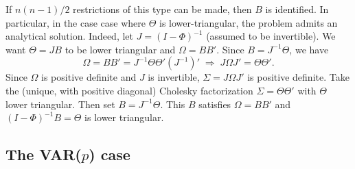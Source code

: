 \documentclass[
  12pt,
]{book}
\theoremstyle{definition}
\theoremstyle{definition}
\theoremstyle{definition}
\theoremstyle{definition}
\theoremstyle{remark}
\begin{document}
If \(n(n-1)/2\) restrictions of this type can be made, then \(B\) is identified. In particular, in the case case where \(\Theta\) is lower-triangular, the problem admits an analytical solution. Indeed, let \(J = (I - \Phi)^{-1}\) (assumed to be invertible). We want \(\Theta = JB\) to be lower triangular and \(\Omega = BB'\). Since \(B = J^{-1} \Theta\), we have
\[
\Omega = BB' = J^{-1} \Theta \Theta' (J^{-1})' \;\Rightarrow\; J\Omega J' = \Theta \Theta'.
\]
Since \(\Omega\) is positive definite and \(J\) is invertible, \(\Sigma = J\Omega J'\) is positive definite. Take the (unique, with positive diagonal) Cholesky factorization \(\Sigma = \Theta \Theta'\) with \(\Theta\) lower triangular. Then set \(B = J^{-1} \Theta\). This \(B\) satisfies \(\Omega = BB'\) and \((I - \Phi)^{-1}B = \Theta\) is lower triangular.

\subsection{\texorpdfstring{The VAR(\(p\)) case}{The VAR(p) case}}\label{the-varp-case}
\end{document}
